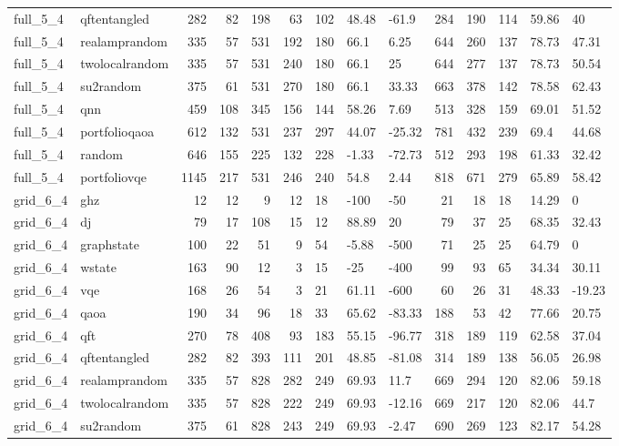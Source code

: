 \begin{longtable}{llrrrrlllrrlll}
full\_5\_4 & qftentangled & 282 & 82 & 198 & 63 & 102 & 48.48 & -61.9 & 284 & 190 & 114 & 59.86 & 40 \\
full\_5\_4 & realamprandom & 335 & 57 & 531 & 192 & 180 & 66.1 & 6.25 & 644 & 260 & 137 & 78.73 & 47.31 \\
full\_5\_4 & twolocalrandom & 335 & 57 & 531 & 240 & 180 & 66.1 & 25 & 644 & 277 & 137 & 78.73 & 50.54 \\
full\_5\_4 & su2random & 375 & 61 & 531 & 270 & 180 & 66.1 & 33.33 & 663 & 378 & 142 & 78.58 & 62.43 \\
full\_5\_4 & qnn & 459 & 108 & 345 & 156 & 144 & 58.26 & 7.69 & 513 & 328 & 159 & 69.01 & 51.52 \\
full\_5\_4 & portfolioqaoa & 612 & 132 & 531 & 237 & 297 & 44.07 & -25.32 & 781 & 432 & 239 & 69.4 & 44.68 \\
full\_5\_4 & random & 646 & 155 & 225 & 132 & 228 & -1.33 & -72.73 & 512 & 293 & 198 & 61.33 & 32.42 \\
full\_5\_4 & portfoliovqe & 1145 & 217 & 531 & 246 & 240 & 54.8 & 2.44 & 818 & 671 & 279 & 65.89 & 58.42 \\
grid\_6\_4 & ghz & 12 & 12 & 9 & 12 & 18 & -100 & -50 & 21 & 18 & 18 & 14.29 & 0 \\
grid\_6\_4 & dj & 79 & 17 & 108 & 15 & 12 & 88.89 & 20 & 79 & 37 & 25 & 68.35 & 32.43 \\
grid\_6\_4 & graphstate & 100 & 22 & 51 & 9 & 54 & -5.88 & -500 & 71 & 25 & 25 & 64.79 & 0 \\
grid\_6\_4 & wstate & 163 & 90 & 12 & 3 & 15 & -25 & -400 & 99 & 93 & 65 & 34.34 & 30.11 \\
grid\_6\_4 & vqe & 168 & 26 & 54 & 3 & 21 & 61.11 & -600 & 60 & 26 & 31 & 48.33 & -19.23 \\
grid\_6\_4 & qaoa & 190 & 34 & 96 & 18 & 33 & 65.62 & -83.33 & 188 & 53 & 42 & 77.66 & 20.75 \\
grid\_6\_4 & qft & 270 & 78 & 408 & 93 & 183 & 55.15 & -96.77 & 318 & 189 & 119 & 62.58 & 37.04 \\
grid\_6\_4 & qftentangled & 282 & 82 & 393 & 111 & 201 & 48.85 & -81.08 & 314 & 189 & 138 & 56.05 & 26.98 \\
grid\_6\_4 & realamprandom & 335 & 57 & 828 & 282 & 249 & 69.93 & 11.7 & 669 & 294 & 120 & 82.06 & 59.18 \\
grid\_6\_4 & twolocalrandom & 335 & 57 & 828 & 222 & 249 & 69.93 & -12.16 & 669 & 217 & 120 & 82.06 & 44.7 \\
grid\_6\_4 & su2random & 375 & 61 & 828 & 243 & 249 & 69.93 & -2.47 & 690 & 269 & 123 & 82.17 & 54.28 \\

\end{longtable}
